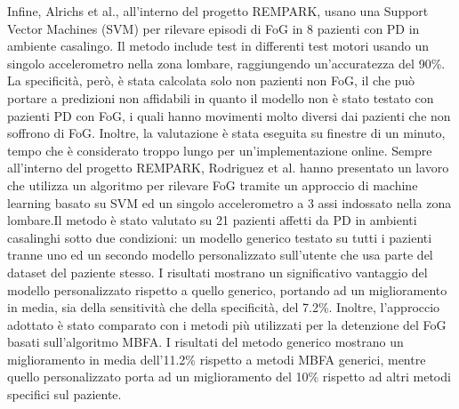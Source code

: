 Infine, Alrichs et al., all'interno del progetto REMPARK\cite{55}, usano una Support Vector Machines (SVM) per rilevare episodi di FoG in 8 pazienti con PD in ambiente casalingo. Il metodo include test in differenti test motori usando un singolo accelerometro nella zona lombare, raggiungendo un'accuratezza del 90\%. La specificità, però, è stata calcolata solo non pazienti non FoG, il che può portare a predizioni non affidabili in quanto il modello non è stato testato con pazienti PD con FoG, i quali hanno movimenti molto diversi dai pazienti che non soffrono di FoG. Inoltre, la valutazione è stata eseguita su finestre di un minuto, tempo che è considerato troppo lungo per un'implementazione online\cite{28}. Sempre all'interno del progetto REMPARK, Rodriguez et al. hanno presentato un lavoro che utilizza un algoritmo per rilevare FoG tramite un approccio di machine learning basato su SVM ed un singolo accelerometro a 3 assi indossato nella zona lombare\cite{HD}.Il metodo è stato valutato su 21 pazienti affetti da PD in ambienti casalinghi sotto due condizioni: un modello generico testato su tutti i pazienti tranne uno ed un secondo modello personalizzato sull'utente che usa parte del dataset del paziente stesso. I risultati mostrano un significativo vantaggio del modello personalizzato rispetto a quello generico, portando ad un miglioramento in media, sia della sensitività che della specificità, del 7.2\%. Inoltre, l'approccio adottato è stato comparato con i metodi più utilizzati per la detenzione del FoG basati sull'algoritmo MBFA. I risultati del metodo generico mostrano un miglioramento in media dell'11.2\% rispetto a metodi MBFA generici, mentre quello personalizzato porta ad un miglioramento del 10\% rispetto ad altri metodi specifici sul paziente.